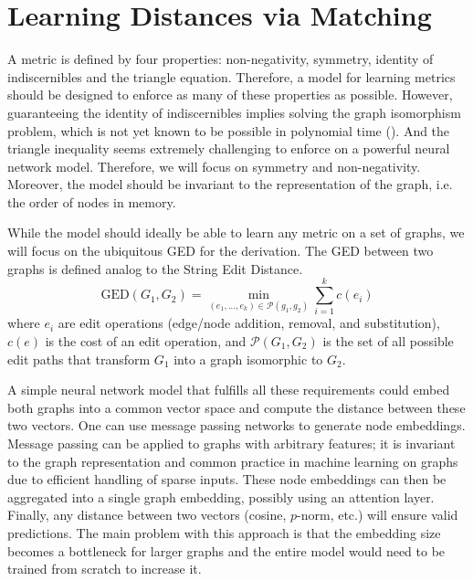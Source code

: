 \section{Learning Distances via Matching}

A metric is defined by four properties: non-negativity, symmetry, identity of indiscernibles and the triangle equation. Therefore, a model for learning metrics should be designed to enforce as many of these properties as possible. However, guaranteeing the identity of indiscernibles implies solving the graph isomorphism problem, which is not yet known to be possible in polynomial time (\citealp{np_complete1998}). And the triangle inequality seems extremely challenging to enforce on a powerful neural network model. Therefore, we will focus on symmetry and non-negativity. Moreover, the model should be invariant to the representation of the graph, i.e. the order of nodes in memory.

While the model should ideally be able to learn any metric on a set of graphs, we will focus on the ubiquitous GED for the derivation. The GED between two graphs is defined analog to the String Edit Distance.
\begin{equation}
     \text{GED}(G_{1},G_{2}) = \min_{(e_{1},...,e_{k}) \in \mathcal{P}(g_{1},g_{2})} \sum_{i=1}^{k} c(e_{i})
\end{equation}
where $e_{i}$ are edit operations (edge/node addition, removal, and substitution), $c(e)$ is the cost of an edit operation, and $\mathcal{P}(G_{1},G_{2})$ is the set of all possible edit paths that transform $G_{1}$ into a graph isomorphic to $G_{2}$.

A simple neural network model that fulfills all these requirements could embed both graphs into a common vector space and compute the distance between these two vectors. One can use message passing networks to generate node embeddings. Message passing can be applied to graphs with arbitrary features; it is invariant to the graph representation and common practice in machine learning on graphs due to efficient handling of sparse inputs. These node embeddings can then be aggregated into a single graph embedding, possibly using an attention layer. Finally, any distance between two vectors (cosine, $p$-norm, etc.) will ensure valid predictions. The main problem with this approach is that the embedding size becomes a bottleneck for larger graphs and the entire model would need to be trained from scratch to increase it.

